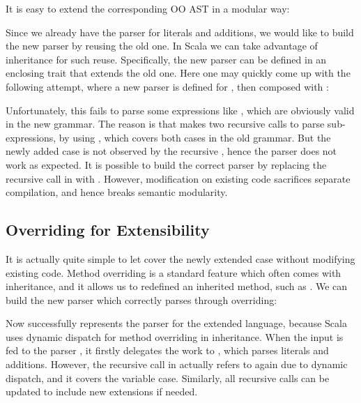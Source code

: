 It is easy to extend the corresponding OO AST in a modular way:


Since we already have the parser for literals and additions, we would
like to build the new parser by reusing the old one. In Scala we can take advantage of inheritance for such reuse. Specifically,
the new parser can be defined in an enclosing trait that extends
the old one. Here one may quickly come up
with the following attempt, where a new parser is defined for , then composed
with :


Unfortunately, this fails to parse some expressions like , which are obviously valid in the new grammar.
The reason is that  makes two recursive calls to parse sub-expressions, by using , which
covers both cases in the old grammar. But the newly added case  is not observed by the recursive ,
hence the parser does not work as expected. It is possible to build the correct parser by replacing the recursive call in  with .
However, modification on existing code sacrifices separate compilation, and hence breaks semantic modularity.

\subsection{Overriding for Extensibility}\label{subsec:overriding}

It is actually quite simple to let  cover the newly
extended case without modifying existing code. Method overriding is a
standard feature which often comes with inheritance, and it allows us
to redefined an inherited method, such as . We can
build the new parser which correctly parses 
through overriding:


Now  successfully represents the parser for the extended language, because Scala uses dynamic dispatch for
method overriding in inheritance. When the input  is fed to the parser , it firstly delegates
the work to , which parses literals and additions. However, the recursive call  in 
actually refers to  again due to dynamic dispatch, and it covers the variable case. Similarly, all recursive calls can be updated to include new extensions if needed.

